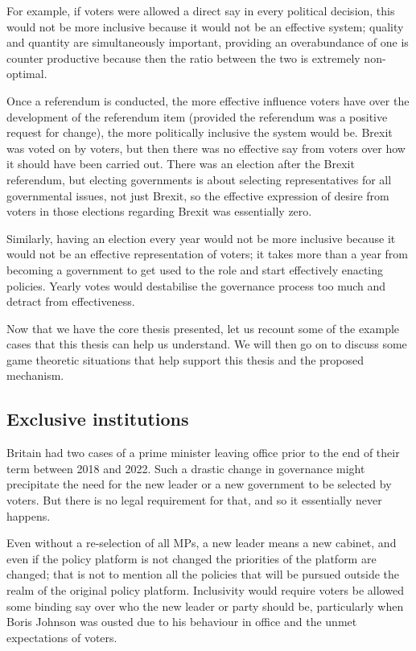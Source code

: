 \documentclass[twoside]{article}
\theoremstyle{definition}
\begin{document}
For example, if voters were allowed a direct say in every political decision, this would not be more inclusive because it would not be an effective system; quality and quantity are simultaneously important, providing an overabundance of one is counter productive because then the ratio between the two is extremely non-optimal.

Once a referendum is conducted, the more effective influence voters have over the development of the referendum item (provided the referendum was a positive request for change), the more politically inclusive the system would be. Brexit was voted on by voters, but then there was no effective say from voters over how it should have been carried out. There was an election after the Brexit referendum, but electing governments is about selecting representatives for all governmental issues, not just Brexit, so the effective expression of desire from voters in those elections regarding Brexit was essentially zero.

Similarly, having an election every year would not be more inclusive because it would not be an effective representation of voters; it takes more than a year from becoming a government to get used to the role and start effectively enacting policies. Yearly votes would destabilise the governance process too much and detract from effectiveness.

Now that we have the core thesis presented, let us recount some of the example cases that this thesis can help us understand. We will then go on to discuss some game theoretic situations that help support this thesis and the proposed mechanism.

\subsection{Exclusive institutions}

Britain had two cases of a prime minister leaving office prior to the end of their term between 2018 and 2022. Such a drastic change in governance might precipitate the need for the new leader or a new government to be selected by voters. But there is no legal requirement for that, and so it essentially never happens.

Even without a re-selection of all MPs, a new leader means a new cabinet, and even if the policy platform is not changed the priorities of the platform are changed; that is not to mention all the policies that will be pursued outside the realm of the original policy platform. Inclusivity would require voters be allowed some binding say over who the new leader or party should be, particularly when Boris Johnson was ousted due to his behaviour in office and the unmet expectations of voters.
\end{document}
